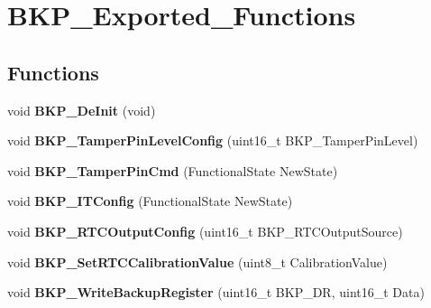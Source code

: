 \hypertarget{group__BKP__Exported__Functions}{
\section{BKP\_\-Exported\_\-Functions}
\label{group__BKP__Exported__Functions}
}
\subsection*{Functions}
\begin{DoxyCompactItemize}
\item 
\hypertarget{group__BKP__Exported__Functions_gaabff4d8f5ebf4fd9a840bcc9042ca226}{
void {\bfseries BKP\_\-DeInit} (void)}
\label{group__BKP__Exported__Functions_gaabff4d8f5ebf4fd9a840bcc9042ca226}

\item 
\hypertarget{group__BKP__Exported__Functions_gae216446d641d075fb575ce6dbe2ff4c1}{
void {\bfseries BKP\_\-TamperPinLevelConfig} (uint16\_\-t BKP\_\-TamperPinLevel)}
\label{group__BKP__Exported__Functions_gae216446d641d075fb575ce6dbe2ff4c1}

\item 
\hypertarget{group__BKP__Exported__Functions_ga3a0cdff9ad8238ade2c67e2b70f530ac}{
void {\bfseries BKP\_\-TamperPinCmd} (FunctionalState NewState)}
\label{group__BKP__Exported__Functions_ga3a0cdff9ad8238ade2c67e2b70f530ac}

\item 
\hypertarget{group__BKP__Exported__Functions_gab8dbd0c4773f6edb98a28c8ff6a2ead0}{
void {\bfseries BKP\_\-ITConfig} (FunctionalState NewState)}
\label{group__BKP__Exported__Functions_gab8dbd0c4773f6edb98a28c8ff6a2ead0}

\item 
\hypertarget{group__BKP__Exported__Functions_ga3d1b22b3c6a79f7b423616a0af1885bf}{
void {\bfseries BKP\_\-RTCOutputConfig} (uint16\_\-t BKP\_\-RTCOutputSource)}
\label{group__BKP__Exported__Functions_ga3d1b22b3c6a79f7b423616a0af1885bf}

\item 
\hypertarget{group__BKP__Exported__Functions_gad34db08a944450d2e7d56d0fd8db2bca}{
void {\bfseries BKP\_\-SetRTCCalibrationValue} (uint8\_\-t CalibrationValue)}
\label{group__BKP__Exported__Functions_gad34db08a944450d2e7d56d0fd8db2bca}

\item 
\hypertarget{group__BKP__Exported__Functions_ga18d220387db651b3cb71fad5c092e041}{
void {\bfseries BKP\_\-WriteBackupRegister} (uint16\_\-t BKP\_\-DR, uint16\_\-t Data)}
\label{group__BKP__Exported__Functions_ga18d220387db651b3cb71fad5c092e041}


\end{DoxyCompactItemize}
